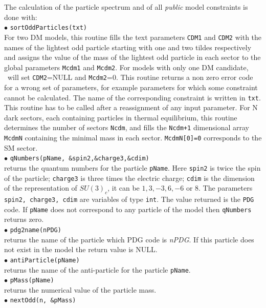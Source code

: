 \documentclass[12pt,a4paper]{article}
\begin{document}
The calculation of the particle spectrum and of all  {\it public} model constraints 
is  done with:\\[2mm]
 $\bullet$ \verb|sortOddParticles(txt)|\\
For two DM models, this routine  fills the text parameters  \verb|CDM1| and \verb|CDM2| with
the  names of the lightest  odd particle  starting  with one and two tildes respectively and 
assigns  the value of the mass  of
the lightest odd particle in each sector to the global parameters  \verb|Mcdm1| and 
\verb|Mcdm2|.  For models with only one DM candidate, \micro\ will set  \verb|CDM2|=NULL and \verb|Mcdm2|=0. 
This routine returns a non zero error code for a
wrong set of parameters, for example parameters  for which some
constraint cannot be calculated.
The name of the corresponding constraint is
written in \verb|txt|. This routine has to be called after a reassignment of any input parameter.
For N dark sectors, each containing particles in thermal equilibrium, this routine 
 determines the number of sectors {\tt Ncdm}, and  fills the {\tt Ncdm+1} dimensional   array   {\tt  McdmN} containing the minimal
mass in each sector. {\tt McdmN[0]=0}  corresponds to the SM sector. \\[2mm]
% 
%
$\bullet$ \verb|qNumbers(pName, &spin2,&charge3,&cdim)|\\
returns the quantum numbers for the particle \verb|pName|. Here \verb|spin2| is twice the spin of the particle; \verb|charge3| is 
three times the electric charge; \verb|cdim| is the  dimension of the representation
of $SU(3)_c$, it can be $1,3,-3,6,-6$ or $8$. The parameters {\tt spin2, charge3, cdim} are 
variables of type {\tt int}. The value returned 
is the {\tt PDG} code. If \verb|pName| does not correspond to any
particle of the model then \verb|qNumbers| returns zero.\\[2mm]
%
$\bullet$  \verb|pdg2name(nPDG)| \\
returns  the name of  the particle which PDG code is {\it nPDG}. If this particle does not exist in the model
the return value is NULL.\\[2mm]
%
$\bullet$  \verb|antiParticle(pName)| \\
returns  the name of the anti-particle for the particle \verb|pName|.\\[2mm]
%
$\bullet$  \verb|pMass(pName)| \\
returns  the numerical value of the particle mass.\\[2mm]
%
$\bullet$  \verb|nextOdd(n, &pMass)| \\
\end{document}
